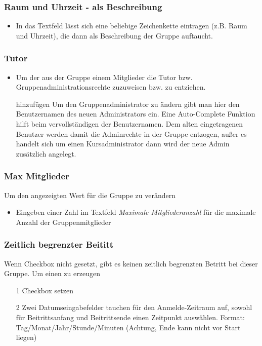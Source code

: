 \subsubsection{Raum und Uhrzeit - als Beschreibung}
\begin{itemize}
	\item In das Textfeld lässt sich eine beliebige Zeichenkette eintragen (z.B. Raum und Uhrzeit), die dann als Beschreibung der Gruppe auftaucht. 
\end{itemize}

\subsubsection{Tutor}
\begin{itemize}
	\item Um der aus der Gruppe einem Mitglieder die Tutor bzw. Gruppenadministrationsrechte zuzuweisen bzw. zu entziehen. 
	\item[hinzufügen] Um den Gruppenadministrator zu ändern gibt man hier den Benutzernamen des neuen Administrators ein. Eine Auto-Complete Funktion hilft beim vervollständigen der Benutzernamen. Dem alten eingetragenen Benutzer werden damit die Adminrechte in der Gruppe entzogen, außer es handelt sich um einen Kursadministrator dann wird der neue Admin zusätzlich angelegt.
\end{itemize}

\subsubsection{Max Mitglieder}
Um den angezeigten Wert für die Gruppe zu verändern
\begin{itemize}
	\item Eingeben einer Zahl im Textfeld \textit{Maximale Mitgliederanzahl} für die maximale Anzahl der Gruppenmitglieder 
\end{itemize}


\subsubsection{Zeitlich begrenzter Beititt}
Wenn Checkbox nicht gesetzt, gibt es keinen zeitlich begrenzten Betritt bei dieser Gruppe. Um einen zu erzeugen
\begin{itemize}
\item[1] Checkbox setzen 
\item[2] Zwei Datumseingabefelder tauchen für den Anmelde-Zeitraum auf, sowohl für Beitrittsanfang und Beitrittsende einen Zeitpunkt auswählen. Format: Tag/Monat/Jahr/Stunde/Minuten 
(Achtung, Ende kann nicht vor Start liegen)
\end{itemize}

